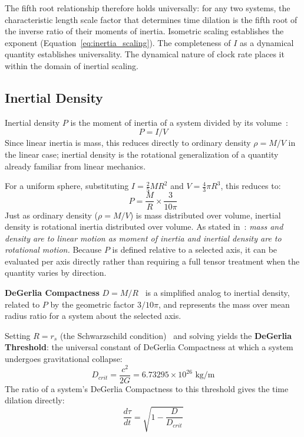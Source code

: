 \documentclass[a4paper,11pt]{article}
\begin{document}
The fifth root relationship therefore holds universally: for any two systems, the characteristic length scale factor that determines time dilation is the fifth root of the inverse ratio of their moments of inertia. Isometric scaling establishes the exponent (Equation~\ref{eq:inertia_scaling}). The completeness of $I$ as a dynamical quantity establishes universality. The dynamical nature of clock rate places it within the domain of inertial scaling.

\subsection{Inertial Density}
Inertial density $P$ is the moment of inertia of a system divided by its volume~\cite{degerlia2025}:
\begin{equation}
P = I/V
\end{equation}
Since linear inertia is mass, this reduces directly to ordinary density $\rho = M/V$ in the linear case; inertial density is the rotational generalization of a quantity already familiar from linear mechanics.

For a uniform sphere, substituting $I = \frac{2}{5}MR^2$ and $V = \frac{4}{3}\pi R^3$, this reduces to:
\begin{equation}
P = \frac{M}{R} \times \frac{3}{10\pi}
\end{equation}
Just as ordinary density ($\rho = M/V$) is mass distributed over volume, inertial density is rotational inertia distributed over volume. As stated in~\cite{degerlia2025}: \textit{mass and density are to linear motion as moment of inertia and inertial density are to rotational motion.} Because $P$ is defined relative to a selected axis, it can be evaluated per axis directly rather than requiring a full tensor treatment when the quantity varies by direction.

\textbf{DeGerlia Compactness} $D = M/R$~\cite{degerlia2025} is a simplified analog to inertial density, related to $P$ by the geometric factor $3/10\pi$, and represents the mass over mean radius ratio for a system about the selected axis.

Setting $R = r_s$ (the Schwarzschild condition)~\cite{schwarzschild1916radius} and solving yields the \textbf{DeGerlia Threshold}: the universal constant of DeGerlia Compactness at which a system undergoes gravitational collapse:
\begin{equation}
D_{crit} = \frac{c^2}{2G} = 6.73295 \times 10^{26} \text{ kg/m}
\end{equation}
The ratio of a system's DeGerlia Compactness to this threshold gives the time dilation directly:
\begin{equation}
\frac{d\tau}{dt} = \sqrt{1 - \frac{D}{D_{crit}}}
\end{equation}
\end{document}
